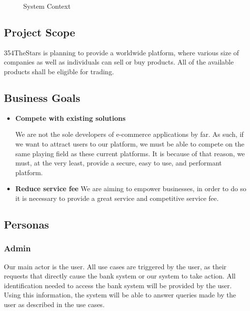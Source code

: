 \documentclass[11pt]{article}
\newcounter{use case ID}
\newcounter{req ID}
\begin{document}
\clearpage

\begin{figure}[htbp]
    \caption{System Context}
    \label{fig:system-context}
\end{figure}

\subsection{Project Scope}
354TheStars is planning to provide a worldwide platform, where various size of companies as well as individuals can sell or buy products. All of the available products shall be eligible for trading.

\subsection{Business Goals}

\begin{itemize}
    \item \textbf{Compete with existing solutions}

        We are not the sole developers of e-commerce applications by far. As such, if we want to attract users to our platform, we must be able to compete on the same playing field as these current platforms. It is because of that reason, we must, at the very least, provide a secure, easy to use, and performant platform.

    \item \textbf{Reduce service fee}
        We are aiming to empower businesses, in order to do so it is necessary to provide a great service and competitive service fee. 

\end{itemize}

\subsection{Personas} \label{actors}
\subsubsection{Admin}
Our main actor is the user. All use cases are triggered by the user, as their requests that directly cause the bank system or our system to take action. All identification needed to access the bank system will be provided by the user. Using this information, the system will be able to answer queries made by the user as described in the use cases.
\end{document}
